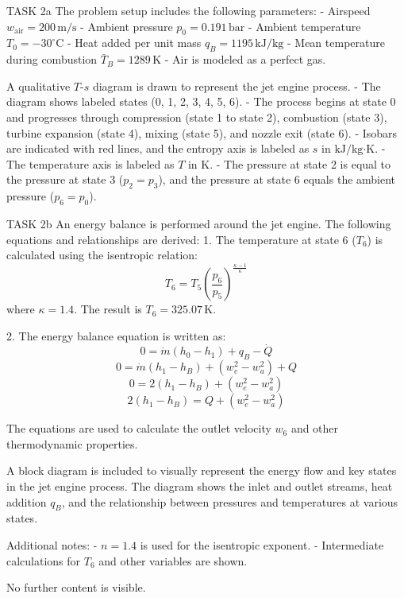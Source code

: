 TASK 2a  
The problem setup includes the following parameters:  
- Airspeed \( w_{\text{air}} = 200 \, \text{m/s} \)  
- Ambient pressure \( p_0 = 0.191 \, \text{bar} \)  
- Ambient temperature \( T_0 = -30^\circ\text{C} \)  
- Heat added per unit mass \( q_B = 1195 \, \text{kJ/kg} \)  
- Mean temperature during combustion \( \bar{T}_B = 1289 \, \text{K} \)  
- Air is modeled as a perfect gas.  

A qualitative \( T \)-\( s \) diagram is drawn to represent the jet engine process.  
- The diagram shows labeled states (0, 1, 2, 3, 4, 5, 6).  
- The process begins at state 0 and progresses through compression (state 1 to state 2), combustion (state 3), turbine expansion (state 4), mixing (state 5), and nozzle exit (state 6).  
- Isobars are indicated with red lines, and the entropy axis is labeled as \( s \) in \( \text{kJ/kg·K} \).  
- The temperature axis is labeled as \( T \) in \( \text{K} \).  
- The pressure at state 2 is equal to the pressure at state 3 (\( p_2 = p_3 \)), and the pressure at state 6 equals the ambient pressure (\( p_6 = p_0 \)).  

TASK 2b  
An energy balance is performed around the jet engine.  
The following equations and relationships are derived:  
1. The temperature at state 6 (\( T_6 \)) is calculated using the isentropic relation:  
\[
T_6 = T_5 \left( \frac{p_6}{p_5} \right)^{\frac{\kappa - 1}{\kappa}}
\]  
where \( \kappa = 1.4 \).  
The result is \( T_6 = 325.07 \, \text{K} \).  

2. The energy balance equation is written as:  
\[
0 = \dot{m} \left( h_0 - h_1 \right) + q_B - \dot{Q}
\]  
\[
0 = \dot{m} \left( h_1 - h_B \right) + \left( w_e^2 - w_a^2 \right) + Q
\]  
\[
0 = 2 \left( h_1 - h_B \right) + \left( w_e^2 - w_a^2 \right)
\]  
\[
2 \left( h_1 - h_B \right) = Q + \left( w_e^2 - w_a^2 \right)
\]  

The equations are used to calculate the outlet velocity \( w_6 \) and other thermodynamic properties.  

A block diagram is included to visually represent the energy flow and key states in the jet engine process. The diagram shows the inlet and outlet streams, heat addition \( q_B \), and the relationship between pressures and temperatures at various states.  

Additional notes:  
- \( n = 1.4 \) is used for the isentropic exponent.  
- Intermediate calculations for \( T_6 \) and other variables are shown.  

No further content is visible.
